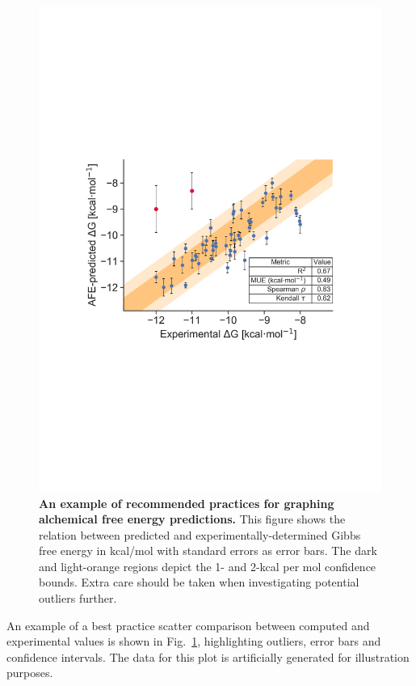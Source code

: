 \documentclass[9pt,bestpractices]{livecoms}
\begin{document}
\begin{figure}
    \includegraphics[width=0.95\linewidth]{figures/fig13_analysis_practices/Figure.pdf}
    \caption{\textbf{An example of recommended practices for graphing alchemical free energy predictions.} This figure shows the relation between predicted and experimentally-determined Gibbs free energy in kcal/mol with standard errors as error bars. The dark and light-orange regions depict the 1- and 2-kcal per mol confidence bounds. Extra care should be taken when investigating potential outliers further.}
    \label{fig:scatterplot_analysis}
\end{figure}

An example of a best practice scatter comparison between computed and experimental values is shown in Fig.~\ref{fig:scatterplot_analysis}, highlighting outliers, error bars and confidence intervals. The data for this plot is artificially generated for illustration purposes.
\end{document}
